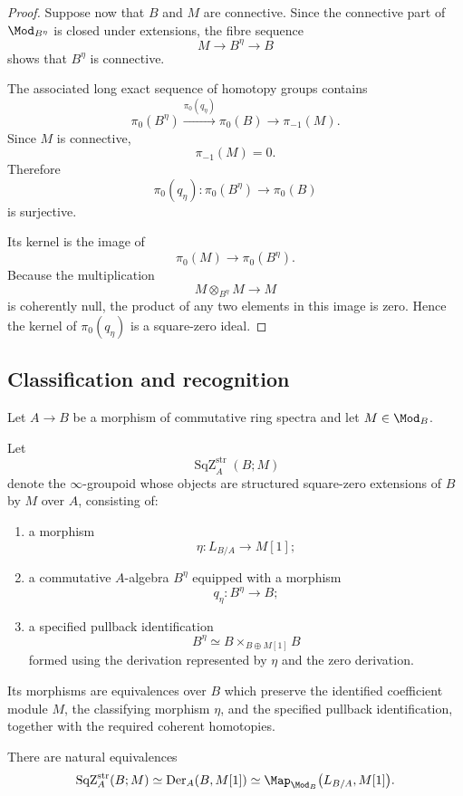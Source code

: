 \begin{proof}
Suppose now that \(B\) and \(M\) are connective. Since the connective
part of \(\Mod_{B^\eta}\) is closed under extensions, the fibre sequence
\[
    M
    \longrightarrow
    B^\eta
    \longrightarrow
    B
\]
shows that \(B^\eta\) is connective.

The associated long exact sequence of homotopy groups contains
\[
    \pi_0(B^\eta)
    \xrightarrow{\pi_0(q_\eta)}
    \pi_0(B)
    \longrightarrow
    \pi_{-1}(M).
\]
Since \(M\) is connective,
\[
    \pi_{-1}(M)
    =
    0.
\]
Therefore
\[
    \pi_0(q_\eta)
    \colon
    \pi_0(B^\eta)
    \longrightarrow
    \pi_0(B)
\]
is surjective.

Its kernel is the image of
\[
    \pi_0(M)
    \longrightarrow
    \pi_0(B^\eta).
\]
Because the multiplication
\[
    M\otimes_{B^\eta}M
    \longrightarrow
    M
\]
is coherently null, the product of any two elements in this image is
zero. Hence the kernel of \(\pi_0(q_\eta)\) is a square-zero ideal.
\end{proof}

\subsection{Classification and recognition}

\begin{theorem}
\label{thm:structured-square-zero-classification}
Let $A\to B$ be a morphism of commutative ring spectra and let
$M\in\Mod_B$.

Let
\[
    \operatorname{SqZ}^{\mathrm{str}}_A(B;M)
\]
denote the $\infty$-groupoid whose objects are structured square-zero
extensions of $B$ by $M$ over $A$, consisting of:
\begin{enumerate}[label=(\roman*)]
    \item a morphism
    \[
        \eta
        \colon
        L_{B/A}
        \longrightarrow
        M[1];
    \]

    \item a commutative $A$-algebra $B^\eta$ equipped with a morphism
    \[
        q_\eta
        \colon
        B^\eta
        \longrightarrow
        B;
    \]

    \item a specified pullback identification
    \[
        B^\eta
        \simeq
        B
        \times_{B\oplus M[1]}
        B
    \]
    formed using the derivation represented by $\eta$ and the zero
    derivation.
\end{enumerate}
Its morphisms are equivalences over $B$ which preserve the identified
coefficient module $M$, the classifying morphism $\eta$, and the
specified pullback identification, together with the required coherent
homotopies.

There are natural equivalences
\[
    \operatorname{SqZ}^{\mathrm{str}}_A(B;M)
    \simeq
    \operatorname{Der}_A(B,M[1])
    \simeq
    \Map_{\Mod_B}
    \bigl(
        L_{B/A},
        M[1]
    \bigr).
\]
\end{theorem}

